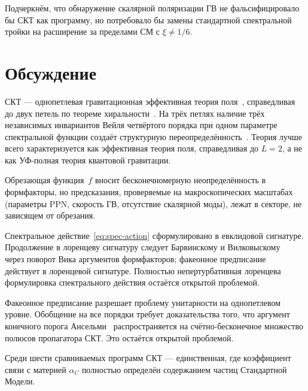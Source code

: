 \documentclass[12pt,a4paper]{article}
\theoremstyle{plain}
\theoremstyle{definition}
\theoremstyle{remark}
\begin{document}
{{{{{{\begin{table}[ht]
\smallskip{}
\normalsize
\end{table}

Подчеркнём, что обнаружение скалярной поляризации ГВ не
фальсифицировало бы СКТ как программу, но потребовало бы замены
стандартной спектральной тройки на расширение за пределами СМ с $\xi \neq 1/6$.

\section{Обсуждение}
\label{sec:discussion}

СКТ --- однопетлевая гравитационная эффективная теория
поля~\cite{Donoghue:1994}, справедливая до двух петель по теореме
хиральности~\cite{Alfyorov:2026paper3}. На трёх петлях наличие
трёх независимых инвариантов Вейля четвёртого порядка при одном параметре
спектральной функции создаёт структурную
переопределённость~\cite{Alfyorov:2026paper3}. Теория лучше всего
характеризуется как эффективная теория поля, справедливая до $L = 2$, а не как
УФ-полная теория квантовой гравитации.

Обрезающая функция~$f$ вносит бесконечномерную неопределённость в
формфакторы, но предсказания, проверяемые на макроскопических
масштабах (параметры PPN, скорость ГВ, отсутствие скалярной моды),
лежат в секторе, не зависящем от обрезания.

Спектральное действие~\eqref{eq:spec-action} сформулировано в
евклидовой сигнатуре. Продолжение в лоренцеву сигнатуру следует
Барвинскому и Вилковыскому~\cite{BV:1990} через поворот Вика
аргументов формфакторов; факеонное
предписание~\cite{Anselmi:2017} действует в лоренцевой сигнатуре.
Полностью непертурбативная лоренцева формулировка спектрального
действия остаётся открытой проблемой.

Факеонное предписание разрешает проблему унитарности на однопетлевом
уровне. Обобщение на все порядки требует доказательства того, что
аргумент конечного порога Ансельми~\cite{Anselmi:2018}
распространяется на счётно-бесконечное множество полюсов пропагатора
СКТ. Это остаётся открытой проблемой.

Среди шести сравниваемых программ СКТ --- единственная, где
коэффициент связи с материей $\alpha_C$ полностью определён
содержанием частиц Стандартной Модели.

}}}}}}
\end{document}
